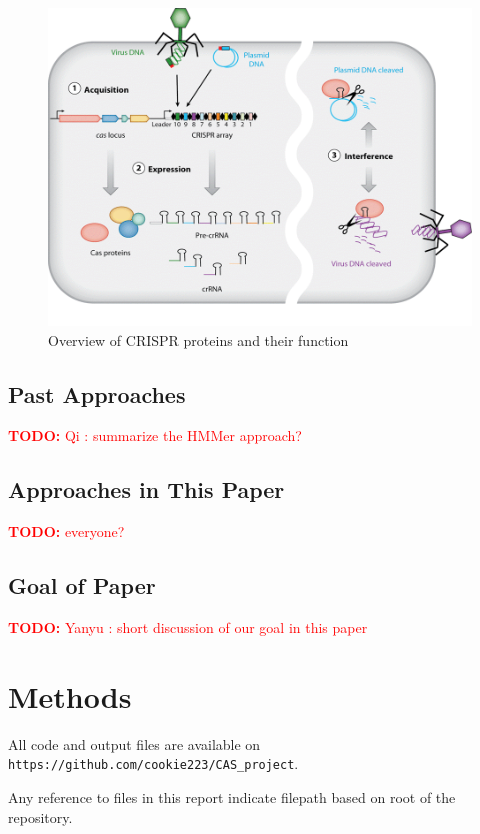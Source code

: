 \documentclass[11pt, oneside]{article}
\newcommand{\TODO}[1]{\textcolor{red}{\textbf{TODO: } #1}}
\begin{document}
\begin{figure}[ht]
  \centering
  \includegraphics[scale = 0.4]{images/crisprOverview}
      \caption{Overview of CRISPR proteins and their function ~\cite{annualreview}}
      \label{crisprOverview}
\end{figure}

\subsection{Past Approaches}
\TODO{Qi : summarize the HMMer approach?}

\subsection{Approaches in This Paper}
\TODO{everyone?}



\subsection{Goal of Paper}


\TODO{Yanyu : short discussion of our goal in this paper}



\section{Methods}

All code and output files are available on \texttt{https://github.com/cookie223/CAS\_project}. 

Any reference to files in this report indicate filepath based on root of the repository. 
\end{document}
